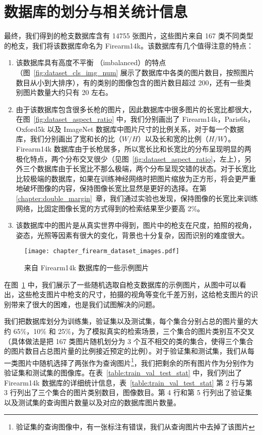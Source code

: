 \section{数据库的划分与相关统计信息}\label{sec:dataset_stats}
最终，我们得到的枪支数据库含有 14755 张图片，这些图片来自 167 类不同类型的枪支，我们将该数据库命名为 Firearm14k。该数据库有几个值得注意的特点：

\begin{enumerate}
\item  该数据库具有高度不平衡 （imbalanced）的特点（图~\ref{fig:dataset_cls_img_num} 展示了数据库中各类的图片数目，按照图片数目从小到大排序），有的类别的图像包含的图片数目超过 200，还有一些类别图片数量大约只有 20 左右。

\item  由于该数据库包含很多长枪的图片，因此数据库中很多图片的长宽比都很大，在图~\ref{fig:dataset_aspect_ratio} 中，我们分别画出了 Firearm14k，Paris6k，Oxford5k 以及 ImageNet 数据库中图片尺寸的比例关系，对于每一个数据库，我们分别画出了宽和长的比（$W/H$）以及长和宽的比例（$H/W$）。Firearm14k 数据库由于长枪居多，所以宽长比和长宽比的分布呈现明显的两极化特点，两个分布交叉很少（见图~\ref{fig:dataset_aspect_ratio}，左上），另外三个数据库由于长宽比不那么极端，两个分布呈现交错的状态。对于长宽比比较极端的数据库，如果在训练神经网络时把图片缩放为正方形，将会更严重地破坏图像的内容，保持图像长宽比显然是更好的选择。在第 \ref{chapter:double_margin}~章，我们通过实验也发现，保持图像的长宽比来训练网络，比固定图像长宽的方式得到的检索结果至少要高 2\%。

\item 该数据库中的图片是从真实世界中得到，图片中的枪支在尺度，拍照的视角，姿态，光照等因素有很大的变化，背景也十分复杂，因而识别的难度很大。
\end{enumerate}

\begin{figure}[!t]
	\centering
	\texttt{[image: chapter\_firearm\_dataset\_images.pdf]}
	\caption{来自 Firearm14k 数据库的一些示例图片}
	\label{fig:dataset_sample_images}
\end{figure}


在图~\ref{fig:dataset_sample_images} 中，我们展示了一些随机选取自枪支数据库的示例图片，从图中可以看出，这些枪支图片中枪支的尺寸，拍摄的视角等变化千差万别，这给枪支图片的识别带来了很大的困难，也是我们试图解决的问题。

我们把数据库划分为训练集，验证集以及测试集，每个集合分别占总的图片量的大约 65\%，10\% 和 25\%，为了模拟真实的检索场景，三个集合的图片类别互不交叉 （具体做法是把 167 类图片随机划分为 3 个互不相交的类的集合，使得三个集合的图片数目占总图片量的比例接近预定的比例）。对于验证集和测试集，我们从每一类图片中随机选择了两张作为查询图片\footnote{验证集的查询图像中，有一张标注有错误，我们从查询图片中去掉了该图片}，我们把剩余的所有图片作为分别作为验证集和测试集的图像库。在表~\ref{table:train_val_test_stat} 中，我们列出了 Firearm14k 数据库的详细统计信息，表~\ref{table:train_val_test_stat} 第 2 行与第 3 行列出了三个集合的图片类别数目，图像数目。第 4 行和第 5 行列出了验证集以及测试集的查询图片数量以及对应的数据库图片数量。

